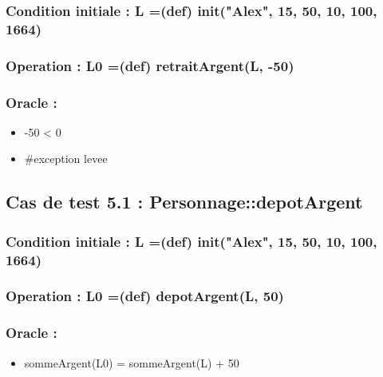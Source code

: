 \documentclass[11pt]{article}
\begin{document}
\subsubsection{Condition initiale :  L =(def) init("Alex", 15, 50, 10, 100, 1664)}
\label{sec-1.12.1}

\subsubsection{Operation : L0 =(def) retraitArgent(L, -50)}
\label{sec-1.12.2}

\subsubsection{Oracle :}
\label{sec-1.12.3}

\begin{itemize}

\item -50 < 0\\
\label{sec-1.12.3.1}


\item \#exception levee\\
\label{sec-1.12.3.2}





\end{itemize} %
\subsection{Cas de test 5.1 : Personnage::depotArgent}
\label{sec-1.13}

\subsubsection{Condition initiale :  L =(def) init("Alex", 15, 50, 10, 100, 1664)}
\label{sec-1.13.1}

\subsubsection{Operation : L0 =(def) depotArgent(L, 50)}
\label{sec-1.13.2}

\subsubsection{Oracle :}
\label{sec-1.13.3}

\begin{itemize}

\item sommeArgent(L0) = sommeArgent(L) + 50\\
\label{sec-1.13.3.1}


\end{itemize} %
\end{document}
